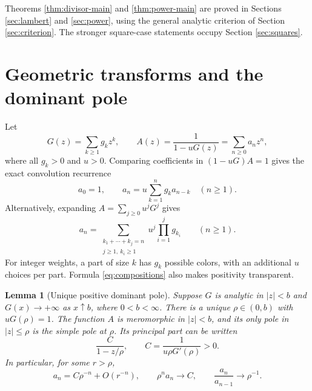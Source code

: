 \documentclass[11pt,letterpaper]{article}
\newtheorem{lemma}[theorem]{Lemma}
\theoremstyle{definition}
\numberwithin{equation}{section}
\begin{document}
Theorems \ref{thm:divisor-main} and \ref{thm:power-main} are proved in
Sections \ref{sec:lambert} and \ref{sec:power}, using the general analytic
criterion of Section \ref{sec:criterion}. The stronger square-case
statements occupy Section \ref{sec:squares}.

\section{Geometric transforms and the dominant pole}
\label{sec:framework}

Let
\begin{equation}\label{eq:general-transform}
G(z)=\sum_{k\ge1}g_kz^k,\qquad
A(z)=\frac{1}{1-uG(z)}=\sum_{n\ge0}a_nz^n,
\end{equation}
where all $g_k>0$ and $u>0$. Comparing coefficients in
$(1-uG)A=1$ gives the exact convolution recurrence
\begin{equation}\label{eq:convolution}
a_0=1,\qquad a_n=u\sum_{k=1}^n g_ka_{n-k}\quad(n\ge1).
\end{equation}
Alternatively, expanding $A=\sum_{j\ge0}u^jG^j$ gives
\begin{equation}\label{eq:compositions}
a_n=\sum_{\substack{k_1+\cdots+k_j=n\\j\ge1,\ k_i\ge1}}
 u^j\prod_{i=1}^j g_{k_i}\qquad(n\ge1).
\end{equation}
For integer weights, a part of size $k$ has $g_k$ possible colors, with
an additional $u$ choices per part. Formula \eqref{eq:compositions} also
makes positivity transparent.

\begin{lemma}[Unique positive dominant pole]\label{lem:dominant}
Suppose $G$ is analytic in $|z|<b$ and $G(x)\to+\infty$ as $x\uparrow b$,
where $0<b<\infty$. There is a unique $\rho\in(0,b)$ with
$uG(\rho)=1$. The function $A$ is meromorphic in $|z|<b$, and its only
pole in $|z|\le\rho$ is the simple pole at $\rho$. Its principal part can
be written
\begin{equation}\label{eq:C}
\frac{C}{1-z/\rho},\qquad C=\frac{1}{u\rho G'(\rho)}>0.
\end{equation}
In particular, for some $r>\rho$,
\begin{equation}\label{eq:dominant-asymptotic}
a_n=C\rho^{-n}+O(r^{-n}),\qquad
\rho^na_n\longrightarrow C,\qquad
\frac{a_n}{a_{n-1}}\longrightarrow\rho^{-1}.
\end{equation}
\end{lemma}
\end{document}
